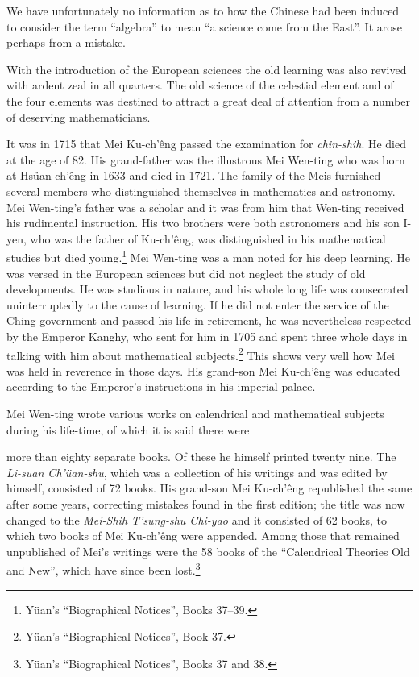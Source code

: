 \documentclass[11pt]{article}
\newcommand{\scanpage}[2]{\clearpage\setcounter{footnote}{0}\noindent{\footnotesize\color{gray}PDF page #1 · #2}\par\medskip}
\newcommand{\scanfooter}{}
\begin{document}
We have unfortunately no information as to how the Chinese had been induced to consider the term ``algebra'' to mean ``a science come from the East''. It arose perhaps from a mistake.

With the introduction of the European sciences the old learning was also revived with ardent zeal in all quarters. The old science of the celestial element and of the four elements was destined to attract a great deal of attention from a number of deserving mathematicians.

It was in 1715 that Mei Ku-ch'êng passed the examination for \emph{chin-shih}. He died at the age of 82. His grand-father was the illustrous Mei Wen-ting who was born at Hsüan-ch'êng in 1633 and died in 1721. The family of the Meis furnished several members who distinguished themselves in mathematics and astronomy. Mei Wen-ting's father was a scholar and it was from him that Wen-ting received his rudimental instruction. His two brothers were both astronomers and his son I-yen, who was the father of Ku-ch'êng, was distinguished in his mathematical studies but died young.\footnote{Yüan's ``Biographical Notices'', Books 37--39.} Mei Wen-ting was a man noted for his deep learning. He was versed in the European sciences but did not neglect the study of old developments. He was studious in nature, and his whole long life was consecrated uninterruptedly to the cause of learning. If he did not enter the service of the Ching government and passed his life in retirement, he was nevertheless respected by the Emperor Kanghy, who sent for him in 1705 and spent three whole days in talking with him about mathematical subjects.\footnote{Yüan's ``Biographical Notices'', Book 37.} This shows very well how Mei was held in reverence in those days. His grand-son Mei Ku-ch'êng was educated according to the Emperor's instructions in his imperial palace.

Mei Wen-ting wrote various works on calendrical and mathematical subjects during his life-time, of which it is said there were
\scanfooter

\scanpage{0136}{Chapter 18, printed page 122}
more than eighty separate books. Of these he himself printed twenty nine. The \emph{Li-suan Ch'üan-shu}, which was a collection of his writings and was edited by himself, consisted of 72 books. His grand-son Mei Ku-ch'êng republished the same after some years, correcting mistakes found in the first edition; the title was now changed to the \emph{Mei-Shih T'sung-shu Chi-yao} and it consisted of 62 books, to which two books of Mei Ku-ch'êng were appended. Among those that remained unpublished of Mei's writings were the 58 books of the ``Calendrical Theories Old and New'', which have since been lost.\footnote{Yüan's ``Biographical Notices'', Books 37 and 38.}
\end{document}
